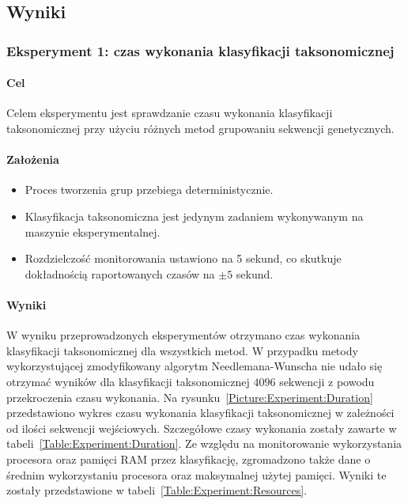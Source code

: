     \subsection{Wyniki}

        \subsubsection{Eksperyment 1: czas wykonania klasyfikacji taksonomicznej}

            \paragraph{Cel}
                Celem eksperymentu jest sprawdzanie czasu wykonania klasyfikacji taksonomicznej przy użyciu różnych metod grupowaniu sekwencji genetycznych. 

            \paragraph{Założenia}
                \begin{itemize}
                    \item {
                        Proces tworzenia grup przebiega deterministycznie.
                    }
                    \item {
                        Klasyfikacja taksonomiczna jest jedynym zadaniem wykonywanym na maszynie eksperymentalnej.
                    }
                    \item {
                        Rozdzielczość monitorowania ustawiono na 5 sekund, co skutkuje dokładnością raportowanych czasów na $\pm 5$ sekund.
                    }
                \end{itemize}

            \paragraph{Wyniki}
                W wyniku przeprowadzonych eksperymentów otrzymano czas wykonania klasyfikacji taksonomicznej dla wszystkich metod. W przypadku metody wykorzystującej zmodyfikowany algorytm Needlemana-Wunscha nie udało się otrzymać wyników dla klasyfikacji taksonomicznej $4096$ sekwencji z powodu przekroczenia czasu wykonania. Na rysunku~\ref{Picture:Experiment:Duration} przedstawiono wykres czasu wykonania klasyfikacji taksonomicznej w zależności od ilości sekwencji wejściowych. Szczegółowe czasy wykonania zostały zawarte w tabeli~\ref{Table:Experiment:Duration}. Ze względu na monitorowanie wykorzystania procesora oraz pamięci RAM przez klasyfikację, zgromadzono także dane o średnim wykorzystaniu procesora oraz maksymalnej użytej pamięci. Wyniki te zostały przedstawione w tabeli~\ref{Table:Experiment:Resources}.

